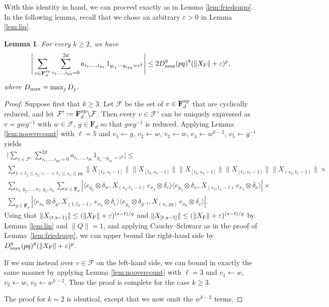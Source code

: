 \documentclass[10pt,reqno]{amsart}
\newtheorem{lem}[thm]{Lemma}
\theoremstyle{definition}
\theoremstyle{remark}
\numberwithin{equation}{section}
\numberwithin{figure}{section}
\numberwithin{table}{section}
\begin{document}
With this identity in hand, we can proceed
exactly as in Lemma \ref{lem:friedsupp}. In the following lemma, recall
that we chose an arbitrary $\varepsilon>0$ in Lemma \ref{lem:lin}.

\begin{lem}
\label{lem:saffriedman}
For every $k\ge 2$, we have 
$$
	\Bigg|
	\sum_{v\in\mathbf{F}_d^{\rm np}}
        \sum_{i_1,\ldots,i_{pq}=0}^{2d}
	a_{i_1,\ldots,i_{pq}}\,
        1_{g_{i_1}\cdots g_{i_{pq}}=v^k}
	\Bigg|
	\le
	2D_{\rm max}^9(pq)^8 (\|X_{\rm F}\|+\varepsilon)^p,
$$
where $D_{\rm max}=\max_j D_j$.
\end{lem}

\begin{proof}
Suppose first that $k\ge 3$. Let $\mathcal{F}$ be the set of $v\in 
\mathbf{F}_d^{\rm np}$ that are cyclically reduced, and let 
$\mathcal{F}':=\mathbf{F}_d^{\rm np}\backslash \mathcal{F}$. Then every 
$v\in\mathcal{F}'$ can be uniquely expressed as $v=gwg^{-1}$ with 
$w\in\mathcal{F}$, $g\in\mathbf{F}_d$ so that $gwg^{-1}$ is reduced.
Applying Lemma \ref{lem:noovercount} with $\ell=5$ and
$v_1\leftarrow g$, $v_2\leftarrow w$, $v_3\leftarrow w$, $v_4\leftarrow 
w^{k-2}$, $v_5\leftarrow g^{-1}$ yields
\begin{multline*}
	\Bigg|
	\sum_{v\in\mathcal{F}'}
        \sum_{i_1,\ldots,i_{pq}=0}^{2d}
	a_{i_1,\ldots,i_{pq}}\,
        1_{g_{i_1}\cdots g_{i_{pq}}=v^k}
	\Bigg|	
	\le \\
	\sum_{1<t_2\le s_2<\cdots<t_5\le s_5\le pq}
	\|X_{[t_2,s_2-1]}\|
	\|X_{[t_3,s_3-1]}\|
	\|X_{[t_4,s_4-1]}\|
	\|X_{[t_5,s_5-1]}\|
	\|X_{(s_4,t_5-1)}\| 
 \times \mbox{}\\
	\sum_{x_2,y_2,\ldots,x_5,y_5,x_6}
	\sum_{w\in\mathbf{F}_d}
	|\langle e_{y_2}\otimes\delta_{w},X_{(s_2,t_3-1)}
	\, e_{x_3}\otimes\delta_e\rangle
	\langle e_{y_3}\otimes\delta_{w},
	X_{(s_3,t_4-1)}\, e_{x_4}\otimes\delta_e\rangle|
\times\mbox{}\\
	\sum_{g\in\mathbf{F}_d}
	|\langle e_{x_6}\otimes\delta_{g},X_{(1,t_2-1)}
	\,e_{x_2}\otimes\delta_e\rangle
	\langle	e_{y_5}\otimes\delta_{g^{-1}},X_{(s_5,pq)}
	\,e_{x_6}\otimes\delta_e\rangle|.
\end{multline*}
Using that 
$\|X_{(t,s-1)}\|\le (\|X_{\rm F}\|+\varepsilon)^{(s-t)/q}$
and
$\|X_{[t,s-1]}\|\le (\|X_{\rm F}\|+\varepsilon)^{(s-t)/q}$
by Lemma \ref{lem:lin} and $\|Q\|=1$, and applying Cauchy--Schwarz 
as in the proof of Lemma~\ref{lem:friedsupp}, we can upper bound
the right-hand side by $D_{\rm max}^9 (pq)^8(\|X_{\rm 
F}\|+\varepsilon)^p$.

If we sum instead over $v\in\mathcal{F}$ on the left-hand side, we can 
bound in exactly the same manner by applying Lemma
\ref{lem:noovercount} with $\ell=3$ and $v_1\leftarrow w$, $v_2\leftarrow 
w$, $v_3\leftarrow w^{k-2}$. Thus the proof is complete for the case
$k\ge 3$.

The proof for $k=2$ is identical, except that we now omit the $w^{k-2}$ 
terms.
\end{proof}
\end{document}
